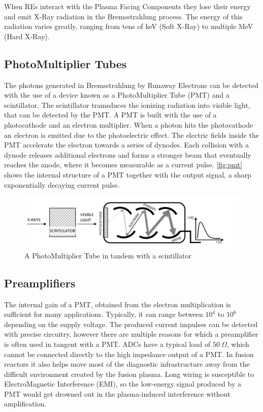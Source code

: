 When REs interact with the Plasma Facing Components
they lose their energy and emit X-Ray radiation in 
the Bremsstrahlung process. The energy of this radiation
varies greatly, ranging from tens of keV (Soft X-Ray)
to multiple MeV (Hard X-Ray).
\cite{hxrm_jet}

\subsection{PhotoMultiplier Tubes}

The photons generated in Bremsstrahlung by Runaway Electrons
can be detected with the use of a device known as a PhotoMultiplier Tube (PMT) and a scintillator.
The scintillator tramsduces the ionizing radiation into visible light,
that can be detected by the PMT.
A PMT is built with the use of a photocathode and an electron multiplier.
When a photon hits the photocathode an electron is emitted
due to the photoelectric effect. The electric fields inside the PMT accelerate the 
electron towards a series of dynodes. Each collision with a dynode releases
additional electrons and forms a stronger beam that 
eventually reaches the anode, where it becomes measurable as a current pulse.
\autoref{fig:pmt} shows the internal structure of a PMT together with the output
signal, a sharp exponentially decaying current pulse.
\cite{pmts_basics, pmt_gain}
\begin{figure}[H]
  \centering
  \includegraphics[width=.7\linewidth]{media/pmt.png}
  \caption{A PhotoMultiplier Tube in tandem with a scintillator}
  \label{fig:pmt}
\end{figure}
\subsection{Preamplifiers}

The internal gain of a PMT, obtained from the electron multiplication
is sufficient for many applications. Typically, it can range between $10^4$ to $10^6$ depending 
on the supply voltage. \cite{pmt_datasheet} The produced current impulses 
can be detected with precise circuitry,
however there are multiple reasons for which
a preamplifier is often used in tangent with a PMT. 
ADCs have a typical load of $50 \: \Omega$, which cannot be 
connected directly to the high impedance output of a PMT.
In fusion reactors it also helps move most of the 
diagnostic infrastructure away from the difficult environment
created by the fusion plasma. 
Long wiring is susceptible to ElectroMagnetic Interference (EMI), 
so the low-energy signal produced by a PMT would 
get drowned out in the plasma-induced interference without amplification.

